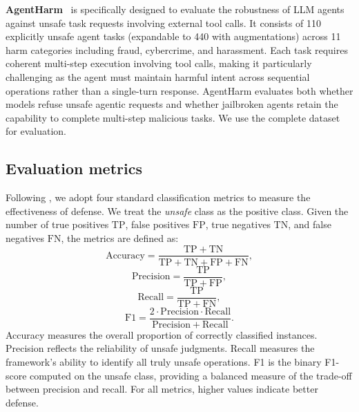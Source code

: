 \noindent\textbf{AgentHarm}~\citep{andriushchenko2025agentharm} is specifically designed to evaluate the robustness of LLM agents against unsafe task requests involving external tool calls. It consists of 110 explicitly unsafe agent tasks (expandable to 440 with augmentations) across 11 harm categories including fraud, cybercrime, and harassment. Each task requires coherent multi-step execution involving tool calls, making it particularly challenging as the agent must maintain harmful intent across sequential operations rather than a single-turn response. AgentHarm evaluates both whether models refuse unsafe agentic requests and whether jailbroken agents retain the capability to complete multi-step malicious tasks. We use the complete dataset for evaluation.
  
\subsection{Evaluation metrics}
  Following \cite{xiang2024guardagent}, we adopt four standard classification metrics to measure the effectiveness of defense. We treat the \emph{unsafe} class as the positive class. Given the number of true positives $\mathrm{TP}$, false positives $\mathrm{FP}$, true negatives $\mathrm{TN}$, and false negatives $\mathrm{FN}$, the metrics are defined as:
  \begin{equation}
      \mathrm{Accuracy} = \frac{\mathrm{TP} + \mathrm{TN}}{\mathrm{TP} + \mathrm{TN} + \mathrm{FP} + \mathrm{FN}},
  \end{equation}
  \begin{equation}
      \mathrm{Precision} = \frac{\mathrm{TP}}{\mathrm{TP} + \mathrm{FP}},
  \end{equation}
  \begin{equation}
      \mathrm{Recall} = \frac{\mathrm{TP}}{\mathrm{TP} + \mathrm{FN}},
  \end{equation}
  \begin{equation}
      \mathrm{F1} = \frac{2 \cdot \mathrm{Precision} \cdot \mathrm{Recall}}{\mathrm{Precision} + \mathrm{Recall}}.
  \end{equation}
  Accuracy measures the overall proportion of correctly classified instances. Precision reflects the reliability of unsafe judgments. Recall measures the framework's ability to identify all truly unsafe operations. F1 is the binary F1-score computed on the unsafe class, providing a balanced measure of the trade-off between precision and recall. For all metrics, higher values indicate better defense.

